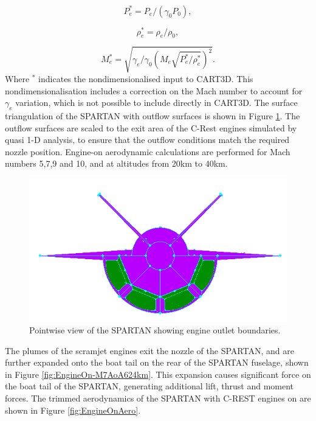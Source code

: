 		\begin{equation}
		P_e^* = P_e/(\gamma_0 P_0),
		\end{equation}
		
		\begin{equation}
		\rho_e^* = \rho_e/\rho_0,
		\end{equation}
		
		\begin{equation}
		M_e^* = \sqrt{\gamma_e/\gamma_0 (M_e \sqrt{ P_e^*/\rho_e^*})^2}.
		\end{equation}
		Where $^*$ indicates the nondimensionalised input to CART3D. This nondimensionalisation includes a correction on the Mach number to account for $\gamma_e$ variation, which is not possible to include directly in CART3D\cite{Mehta2016}. The surface triangulation of the SPARTAN with outflow surfaces is shown in Figure \ref{fig:Pointwise-EngineBC}. The outflow surfaces are scaled to the exit area of the C-Rest engines simulated by quasi 1-D analysis, to ensure that the outflow conditions match the required nozzle position. Engine-on aerodynamic calculations are performed for Mach numbers 5,7,9 and 10, and at altitudes from 20km to 40km.
		\begin{figure}[ht]
			\centering
			\includegraphics[width=0.7\linewidth]{figures/3_vehicle_design/Pointwise-EngineBC}
			\caption{Pointwise view of the SPARTAN showing engine outlet boundaries.}
			\label{fig:Pointwise-EngineBC}
		\end{figure}
		The plumes of the scramjet engines exit the nozzle of the SPARTAN, and are further expanded onto the boat tail on the rear of the SPARTAN fuselage, shown in Figure \ref{fig:EngineOn-M7AoA624km}. This expansion causes significant force on the boat tail of the SPARTAN, generating additional lift, thrust and moment forces. The trimmed aerodynamics of the SPARTAN with C-REST engines on are shown in Figure \ref{fig:EngineOnAero}.
		
